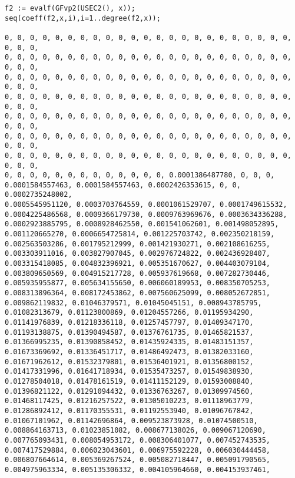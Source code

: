 \documentclass[12pt]{article}
\begin{document}
\begin{verbatim}
f2 := evalf(GFvp2(USEC2(), x));
seq(coeff(f2,x,i),i=1..degree(f2,x));

0, 0, 0, 0, 0, 0, 0, 0, 0, 0, 0, 0, 0, 0, 0, 0, 0, 0, 0, 0, 0, 0, 0, 0, 0, 0, 
0, 0, 0, 0, 0, 0, 0, 0, 0, 0, 0, 0, 0, 0, 0, 0, 0, 0, 0, 0, 0, 0, 0, 0, 0, 0, 
0, 0, 0, 0, 0, 0, 0, 0, 0, 0, 0, 0, 0, 0, 0, 0, 0, 0, 0, 0, 0, 0, 0, 0, 0, 0,
0, 0, 0, 0, 0, 0, 0, 0, 0, 0, 0, 0, 0, 0, 0, 0, 0, 0, 0, 0, 0, 0, 0, 0, 0, 0, 
0, 0, 0, 0, 0, 0, 0, 0, 0, 0, 0, 0, 0, 0, 0, 0, 0, 0, 0, 0, 0, 0, 0, 0, 0, 0, 
0, 0, 0, 0, 0, 0, 0, 0, 0, 0, 0, 0, 0, 0, 0, 0, 0, 0, 0, 0, 0, 0, 0, 0, 0, 0, 
0, 0, 0, 0, 0, 0, 0, 0, 0, 0, 0, 0, 0, 0, 0, 0, 0, 0, 0, 0, 0, 0, 0, 0, 0, 0, 
0, 0, 0, 0, 0, 0, 0, 0, 0, 0, 0, 0, 0, 0.0001386487780, 0, 0, 0, 
0.0001584557463, 0.0001584557463, 0.0002426353615, 0, 0, 0.0002735248002, 
0.0005545951120, 0.0003703764559, 0.0001061529707, 0.0001749615532, 
0.0004225486568, 0.0009366179730, 0.0009763969676, 0.0003634336288, 
0.0002923885795, 0.0008928462550, 0.001541062601, 0.001498052895, 
0.001120665270, 0.0006654725814, 0.001225703742, 0.002350218159, 
0.002563503286, 0.001795212999, 0.001421930271, 0.002108616255, 
0.003303911016, 0.003827907045, 0.002976724822, 0.002436928407, 
0.003315418085, 0.004832396921, 0.005351670627, 0.004403079104, 
0.003809650569, 0.004915217728, 0.005937619668, 0.007282730446, 
0.005935955877, 0.005634155650, 0.006060189953, 0.008350705253, 
0.008313896364, 0.008172453862, 0.007560625099, 0.008052672851, 
0.009862119832, 0.01046379571, 0.01045045151, 0.008943785795, 
0.01082313679, 0.01123800869, 0.01204557266, 0.01195934290, 
0.01141976839, 0.01218336118, 0.01257457797, 0.01409347170, 
0.01193138875, 0.01390494587, 0.01376761735, 0.01465821537, 
0.01366995235, 0.01390858452, 0.01435924335, 0.01483151357, 
0.01673369692, 0.01336451717, 0.01486492473, 0.01382033160, 
0.01671962612, 0.01532379801, 0.01536401921, 0.01356800152, 
0.01417331996, 0.01641718934, 0.01535473257, 0.01549838930, 
0.01278504018, 0.01478161519, 0.01411152129, 0.01593008840, 
0.01396821122, 0.01291094432, 0.01336763267, 0.01309974560, 
0.01468117425, 0.01216257522, 0.01305010223, 0.01118963779, 
0.01286892412, 0.01170355531, 0.01192553940, 0.01096767842, 
0.01067101962, 0.01142696864, 0.009523873928, 0.01074500510, 
0.008864163713, 0.01023851082, 0.008677138026, 0.009067120690, 
0.007765093431, 0.008054953172, 0.008306401077, 0.007452743535, 
0.007417529884, 0.006023043601, 0.006975592228, 0.006030444458, 
0.006807664614, 0.005369267524, 0.005082718447, 0.005091790565, 
0.004975963334, 0.005135306332, 0.004105964660, 0.004153937461, 

\end{verbatim}
\end{document}
